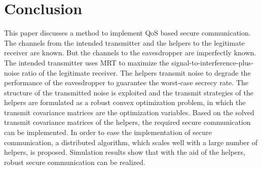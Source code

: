 \documentclass[journal]{IEEEtran}
\begin{document}




\section{Conclusion} \label{sec:conclusion}
This paper discusses a method to implement QoS based secure communication. The channels from the intended transmitter and the helpers to the legitimate receiver are known. But the channels to the eavesdropper are imperfectly known. The intended transmitter uses MRT to maximize the signal-to-interference-plus-noise ratio of the legitimate receiver. The helpers transmit noise to degrade the performance of the eavesdropper to guarantee the worst-case secrecy rate. The structure of the transmitted noise is exploited and the transmit strategies of the helpers are formulated as a robust convex optimization problem, in which the transmit covariance matrices are the optimization variables. Based on the solved transmit covariance matrices of the helpers, the required secure communication can be implemented. In order to ease the implementation of secure communication, a distributed algorithm, which scales well with a large number of helpers, is proposed. Simulation results show that with the aid of the helpers, robust secure communication can be realized.













\end{document}
